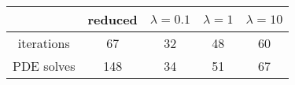 \begin{tabular}{ccccc}
& reduced & $\lambda = 0.1$ & $\lambda = 1$ & $\lambda = 10$ \\
\hline
iterations & 67 & 32 & 48 & 60 \\
PDE solves & 148 & 34 & 51 & 67 \\
\hline
\end{tabular}
